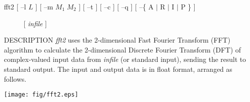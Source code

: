% 
% 
% 
% 
%                                                                        
%
\hypertarget{fft2}{}

\begin{synopsis}
\item[fft2] [ --l $L$ ] [ --m $M_1 \; M_2$ ] [ --t ] [ --c ] [ --q ] 
            [ --\{ A $|$ R $|$ I $|$ P \} ]  
\item[\ ~~~~] [ {\em infile} ]  
\end{synopsis}

\begin{qsection}{DESCRIPTION}
{\em fft2} uses the 2-dimensional Fast Fourier Transform (FFT) algorithm 
to calculate the 2-dimensional Discrete Fourier Transform (DFT) 
of complex-valued input data from {\em infile} (or standard input), 
sending the result to standard output. 
The input and output data is in float format, arranged as follows.
\begin{center}
\leavevmode
\texttt{[image: fig/fft2.eps]}
\end{center}
\end{qsection}

